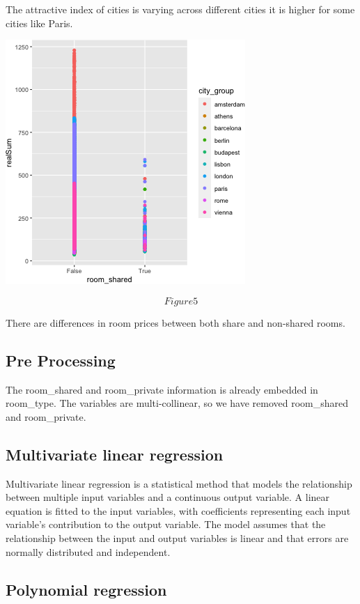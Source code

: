 \documentclass[
]{article}
\begin{document}
The attractive index of cities is varying across different cities it is
higher for some cities like Paris.

\includegraphics{i.png}

\[Figure 5\]

There are differences in room prices between both share and non-shared
rooms.

\hypertarget{pre-processing}{%
\subsection{Pre Processing}\label{pre-processing}}

The room\_shared and room\_private information is already embedded in
room\_type. The variables are multi-collinear, so we have removed
room\_shared and room\_private.

\hypertarget{multivariate-linear-regression}{%
\subsection{Multivariate linear
regression}\label{multivariate-linear-regression}}

Multivariate linear regression is a statistical method that models the
relationship between multiple input variables and a continuous output
variable. A linear equation is fitted to the input variables, with
coefficients representing each input variable's contribution to the
output variable. The model assumes that the relationship between the
input and output variables is linear and that errors are normally
distributed and independent.

\hypertarget{polynomial-regression}{%
\subsection{Polynomial regression}\label{polynomial-regression}}
\end{document}
